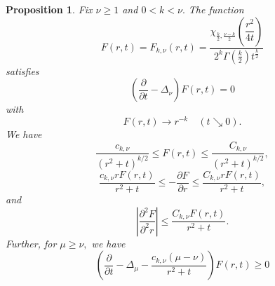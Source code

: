 \documentclass[12pt]{amsart}
\newcommand{\p}{{ \partial}}
\renewcommand{\1}{{\mathbf 1}}
\renewcommand{\p}{{\partial}}
\newtheorem{prop}[thm]{Proposition}
\theoremstyle{others}
\numberwithin{equation}{section}
\begin{document}
\begin{prop}\label{prop:firstsupersol}
Fix $\nu \geq 1$ and $0 < k < \nu.$ 
The function 
$$F(r,t) = F_{k, \nu}(r,t) = \frac{\chi_{\frac{k}{2}, \frac{\nu-k}{2}} \left( \dfrac{r^2}{4t} \right) }{2^k \Gamma\left( \frac{k}{2} \right)  t^{\frac{k}{2} }}$$
satisfies
\begin{equation}\label{firstsupersol:pde}
\left( \frac{\p}{\p t} - \Delta_{\nu} \right) F(r,t) = 0
\end{equation}
with
\begin{equation}
F(r,t) \to r^{-k} \quad (t \searrow 0).
\end{equation}
We have
\begin{equation}\label{firstsupersol:Fbounds}
\frac{c_{k,\nu}}{(r^2 + t)^{k/2}} \leq F(r,t) \leq \frac{C_{k, \nu} }{(r^2 + t)^{k/2}},
\end{equation}
\begin{equation}\label{firstsupersol:dFdrbound}
\frac{c_{k, \nu} r F(r,t)}{r^2 + t }  \leq - \frac{\p F}{\p r} \leq \frac{C_{k, \nu} r F(r,t)}{r^2 + t} ,
\end{equation}
and
\begin{equation}\label{firstsupersol:d2Fdr2bound}
\left| \frac{\p^2 F}{\p^2 r} \right| \leq \frac{C_{k, \nu} F(r,t)}{r^2 + t} .
\end{equation}
Further, for $\mu \geq \nu,$ %
we have
\begin{equation}\label{firstsupersol:evolutionlowerbound}
\left( \frac{\p}{\p t} - \Delta_{\mu} - \frac{ c_{k, \nu} (\mu - \nu) } { r^2 + t } \right) F(r,t) \geq 0  %
\end{equation}
\end{prop}
\end{document}
